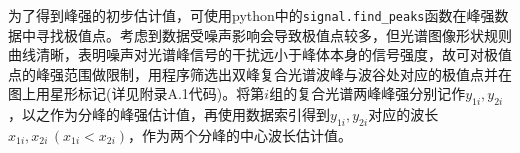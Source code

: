 \documentclass{article}
\numberwithin{equation}{subsection}
\begin{document}
为了得到峰强的初步估计值，可使用python中的\verb|signal.find_peaks|函数在峰强数据中寻找极值点。考虑到数据受噪声影响会导致极值点较多，但光谱图像形状规则曲线清晰，表明噪声对光谱峰信号的干扰远小于峰体本身的信号强度，故可对极值点的峰强范围做限制，用程序筛选出双峰复合光谱波峰与波谷处对应的极值点并在图上用星形标记(详见附录A.1代码)。将第$i$组的复合光谱两峰峰强分别记作$y_{1i},y_{2i}$，以之作为分峰的峰强估计值，再使用数据索引得到$y_{1i},y_{2i}$对应的波长$x_{1i},x_{2i}\,(x_{1i}<x_{2i})$，作为两个分峰的中心波长估计值。
\begin{figure}[htbp]
    \centering
\end{figure}
\end{document}
